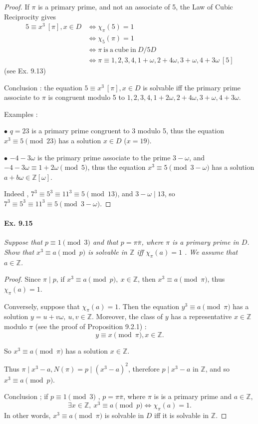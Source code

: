 \documentclass[11pt,a4paper]{article}
\newcommand{\Z}{\mathbb{Z}}
\begin{document}
\begin{proof}
If $\pi$ is a primary prime, and not an associate of 5, the Law of Cubic Reciprocity gives
\begin{align*}
5\equiv x^3 \ [\pi], x \in D &\iff \chi_\pi(5)=1\\
&\iff \chi_5(\pi)=1\\
&\iff  \pi \ \mathrm{ is\ a\ cube\ in\  } D/5D\\
&\iff \pi \equiv1,2,3,4,1+\omega,2+4\omega,3+\omega,4+3\omega \ [5]
\end{align*}
(see Ex. 9.13)

\bigskip

Conclusion : the equation $5\equiv x^3 \ [\pi], x \in D $ is solvable iff the primary prime associate to $\pi$ is congruent modulo 5 to $1,2,3,4,1+2\omega,2+4\omega,3+\omega,4+3\omega$.

Examples : 

$\bullet$ $q=23$ is a primary prime congruent to 3 modulo 5, thus the equation $x^3 \equiv 5\pmod{23}$ has a solution $x  \in D$ ($x = 19)$.

$\bullet$ $-4 - 3 \omega$ is the primary prime associate to the prime $3- \omega$, and $-4 - 3 \omega \equiv 1 + 2 \omega \pmod 5$, thus the equation $x^3 \equiv 5 \pmod {3-\omega}$ has a solution $a + b \omega \in \Z[\omega]$.

Indeed , $7^3 \equiv 5^3 \equiv 11^3 \equiv 5 \pmod {13}$, and $3 - \omega \mid 13$, so $7^3 \equiv 5^3 \equiv 11^3 \equiv 5 \pmod{ 3 - \omega}$.
\end{proof}

\paragraph{Ex. 9.15}

{\it Suppose that $p \equiv 1 \pmod 3$ and that $p = \pi \overline{\pi}$, where $\pi$ is a primary prime in $D$. Show that $x^3 \equiv a \pmod p$ is solvable in $\Z$ iff $\chi_{\pi}(a) = 1$ . We assume that $a \in \Z$.
}

\begin{proof}
Since $\pi \mid p$, if $ x^3 \equiv a \pmod p,\ x \in \Z$, then $ x^3 \equiv a \pmod \pi$, thus $\chi_{\pi}(a) = 1$.

Conversely, suppose that $\chi_{\pi}(a) = 1$. Then the equation $y^3 \equiv a \pmod \pi$ has a solution $y = u + v \omega, \ u,v \in \Z$. Moreover, the class of $y$ has a representative $x \in \Z$ modulo $\pi$ (see the proof of Proposition 9.2.1) :
$$y\equiv  x \pmod \pi, x \in \Z.$$

So $x^3 \equiv a \pmod \pi$ has a solution $x \in \Z$.

Thus $\pi \mid x^3 - a, N(\pi) = p \mid (x^3 -a)^2$, therefore $p \mid x^3 -a$ in $\Z$, and so $x^3 \equiv a \pmod p$.

Conclusion ; if $p\equiv 1 \pmod 3$ , $p = \pi \overline{\pi}$, where $\pi$ is is a primary prime  and $a \in \Z$,
$$\exists x \in \Z, \ x^3 \equiv a \pmod p \iff \chi_{\pi}(a) = 1.$$
In other words, $x^3 \equiv a \pmod \pi$ is solvable in $D$ iff it is solvable in $\Z$.
\end{proof}
\end{document}
